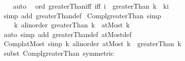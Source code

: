 \begin{isabellebody}
%
\isadelimproof
\ \ %
\endisadelimproof
%
\isatagproof
{}\isamarkupfalse%
\ auto%
\endisatagproof
{\isafoldproof}%
%
\isadelimproof
\isanewline
%
\endisadelimproof
\isanewline
{}\isamarkupfalse%
\ {\isacharparenleft}{\kern0pt}\ ord{\isacharparenright}{\kern0pt}\ greaterThan{\isacharunderscore}{\kern0pt}iff\ {\isacharbrackleft}{\kern0pt}iff{\isacharbrackright}{\kern0pt}{\isacharcolon}{\kern0pt}\ {\isachardoublequoteopen}{\isacharparenleft}{\kern0pt}i\ {\isasymin}\ greaterThan\ k{\isacharparenright}{\kern0pt}\ {\isacharequal}{\kern0pt}\ {\isacharparenleft}{\kern0pt}k{\isacharless}{\kern0pt}i{\isacharparenright}{\kern0pt}{\isachardoublequoteclose}\isanewline
%
\isadelimproof
\ \ %
\endisadelimproof
%
\isatagproof
{}\isamarkupfalse%
\ {\isacharparenleft}{\kern0pt}simp\ add{\isacharcolon}{\kern0pt}\ greaterThan{\isacharunderscore}{\kern0pt}def{\isacharparenright}{\kern0pt}%
\endisatagproof
{\isafoldproof}%
%
\isadelimproof
\isanewline
%
\endisadelimproof
\isanewline
{}\isamarkupfalse%
\ Compl{\isacharunderscore}{\kern0pt}greaterThan\ {\isacharbrackleft}{\kern0pt}simp{\isacharbrackright}{\kern0pt}{\isacharcolon}{\kern0pt}\isanewline
\ \ \ \ {\isachardoublequoteopen}{\isacharbang}{\kern0pt}{\isacharbang}{\kern0pt}k{\isacharcolon}{\kern0pt}{\isacharcolon}{\kern0pt}\ {\isacharprime}{\kern0pt}a{\isacharcolon}{\kern0pt}{\isacharcolon}{\kern0pt}linorder{\isachardot}{\kern0pt}\ {\isacharminus}{\kern0pt}greaterThan\ k\ {\isacharequal}{\kern0pt}\ atMost\ k{\isachardoublequoteclose}\isanewline
%
\isadelimproof
\ \ %
\endisadelimproof
%
\isatagproof
{}\isamarkupfalse%
\ {\isacharparenleft}{\kern0pt}auto\ simp\ add{\isacharcolon}{\kern0pt}\ greaterThan{\isacharunderscore}{\kern0pt}def\ atMost{\isacharunderscore}{\kern0pt}def{\isacharparenright}{\kern0pt}%
\endisatagproof
{\isafoldproof}%
%
\isadelimproof
\isanewline
%
\endisadelimproof
\isanewline
{}\isamarkupfalse%
\ Compl{\isacharunderscore}{\kern0pt}atMost\ {\isacharbrackleft}{\kern0pt}simp{\isacharbrackright}{\kern0pt}{\isacharcolon}{\kern0pt}\ {\isachardoublequoteopen}{\isacharbang}{\kern0pt}{\isacharbang}{\kern0pt}k{\isacharcolon}{\kern0pt}{\isacharcolon}{\kern0pt}\ {\isacharprime}{\kern0pt}a{\isacharcolon}{\kern0pt}{\isacharcolon}{\kern0pt}linorder{\isachardot}{\kern0pt}\ {\isacharminus}{\kern0pt}atMost\ k\ {\isacharequal}{\kern0pt}\ greaterThan\ k{\isachardoublequoteclose}\isanewline
%
\isadelimproof
\ \ %
\endisadelimproof
%
\isatagproof
{}\isamarkupfalse%
\ {\isacharparenleft}{\kern0pt}subst\ Compl{\isacharunderscore}{\kern0pt}greaterThan\ {\isacharbrackleft}{\kern0pt}symmetric{\isacharbrackright}{\kern0pt}{\isacharparenright}{\kern0pt}\isanewline

\end{isabellebody}
